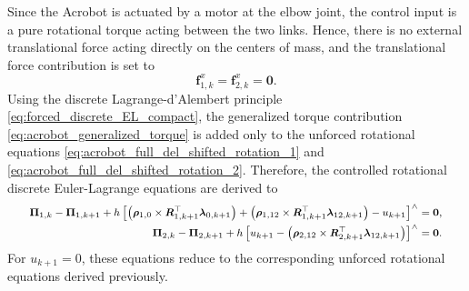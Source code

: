 Since the Acrobot is actuated by a motor at the elbow joint, the control input is a
pure rotational torque acting between the two links. Hence, there is no external
translational force acting directly on the centers of mass, and the translational
force contribution is set to
\begin{equation}
    \bm{f}^{x}_{1,k}
    =
    \bm{f}^{x}_{2,k}
    =
    \bm{0}.
    \label{eq:acrobot_zero_translational_force}
\end{equation}
Using the discrete Lagrange-d'Alembert principle \eqref{eq:forced_discrete_EL_compact}, the generalized torque
contribution \eqref{eq:acrobot_generalized_torque} is added only to the unforced 
rotational equations \eqref{eq:acrobot_full_del_shifted_rotation_1} and \eqref{eq:acrobot_full_del_shifted_rotation_2}. 
Therefore, the controlled rotational discrete Euler-Lagrange equations are derived to
\begin{subequations}
\label{eq:forced_acrobot_rotational_equations}
\begingroup
\footnotesize
\setlength{\jot}{0.25em}
\begin{align}
    \bm{\Pi}_{1,k}
    -
    \bm{\Pi}_{1,k+1}
    +
    h
    \left[
    \left(
    \bm{\rho}_{1,0}
    \times
    \bm{R}_{1,k+1}^{\top}\bm{\lambda}_{0,k+1}
    \right)
    +
    \left(
    \bm{\rho}_{1,12}
    \times
    \bm{R}_{1,k+1}^{\top}\bm{\lambda}_{12,k+1}
    \right)
    -
    u_{k+1}
    \right]^{\wedge}
    &=
    \bm{0},
    \label{eq:forced_acrobot_rotation_link1}
    \\
    \bm{\Pi}_{2,k}
    -
    \bm{\Pi}_{2,k+1}
    +
    h
    \left[
    u_{k+1}
    -
    \left(
    \bm{\rho}_{2,12}
    \times
    \bm{R}_{2,k+1}^{\top}\bm{\lambda}_{12,k+1}
    \right)
    \right]^{\wedge}
    &=
    \bm{0}.
    \label{eq:forced_acrobot_rotation_link2}
\end{align}
\endgroup
\end{subequations}
For \(u_{k+1}=0\), these equations reduce to the corresponding unforced rotational
equations derived previously.
